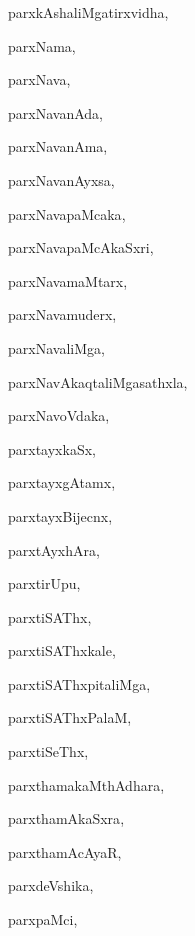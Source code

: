 \begin{multicols}{3}
{\noindent
{parxkAshaliMgatirxvidha}, \pageref{parxkAshaliMgatirxvidha}

\noindent
{parxNama}, \pageref{parxNama}

\noindent
{parxNava}, \pageref{parxNava}

\noindent
{parxNavanAda}, \pageref{parxNavanAda}

\noindent
{parxNavanAma}, \pageref{parxNavanAma}

\noindent
{parxNavanAyxsa}, \pageref{parxNavanAyxsa}

\noindent
{parxNavapaMcaka}, \pageref{parxNavapaMcaka}

\noindent
{parxNavapaMcAkaSxri}, \pageref{parxNavapaMcAkaSxri}

\noindent
{parxNavamaMtarx}, \pageref{parxNavamaMtarx}

\noindent
{parxNavamuderx}, \pageref{parxNavamuderx}

\noindent
{parxNavaliMga}, \pageref{parxNavaliMga}

\noindent
{parxNavAkaqtaliMgasathxla}, \pageref{parxNavAkaqtaliMgasathxla}

\noindent
{parxNavoVdaka}, \pageref{parxNavoVdaka}

\noindent
{parxtayxkaSx}, \pageref{parxtayxkaSx}

\noindent
{parxtayxgAtamx}, \pageref{parxtayxgAtamx}

\noindent
{parxtayxBijecnx}, \pageref{parxtayxBijecnx}

\noindent
{parxtAyxhAra}, \pageref{parxtAyxhAra}

\noindent
{parxtirUpu}, \pageref{parxtirUpu}

\noindent
{parxtiSAThx}, \pageref{parxtiSAThx}

\noindent
{parxtiSAThxkale}, \pageref{parxtiSAThxkale}

\noindent
{parxtiSAThxpitaliMga}, \pageref{parxtiSAThxpitaliMga}

\noindent
{parxtiSAThxPalaM}, \pageref{parxtiSAThxPalaM}

\noindent
{parxtiSeThx}, \pageref{parxtiSeThx}

\noindent
{parxthamakaMthAdhara}, \pageref{parxthamakaMthAdhara}

\noindent
{parxthamAkaSxra}, \pageref{parxthamAkaSxra}

\noindent
{parxthamAcAyaR}, \pageref{parxthamAcAyaR}

\noindent
{parxdeVshika}, \pageref{parxdeVshika}

\noindent
{parxpaMci}, \pageref{parxpaMci}

}
\end{multicols}
